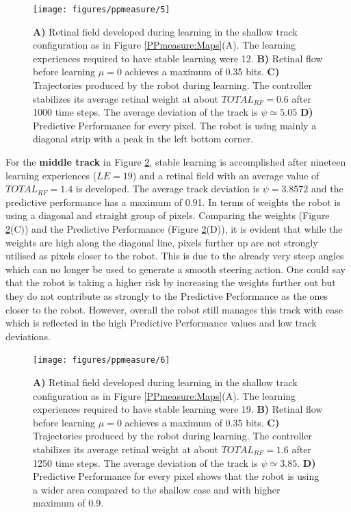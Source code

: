\begin{figure}[!hbt]
	\begin{center}
	\texttt{[image: figures/ppmeasure/5]}
	\end{center}
	\caption[Performance for the shallow track]{
	{\bf A)} Retinal field developed during learning in the shallow track configuration as in Figure \ref{PPmeasure:Maps}(A).
		      The learning experiences required to have stable learning were 12.
	{\bf B)} Retinal flow before learning $\mu=0$ achieves a maximum of 0.35 bits. 
	{\bf C)} Trajectories produced by the robot during learning. The controller stabilizes its average retinal weight at about $TOTAL_{RF}=0.6$ after 1000 time steps. The average deviation of the track is $\psi \simeq 5.05$  
	{\bf D)} Predictive Performance for every pixel. The robot is using mainly a diagonal strip with a peak in the left bottom corner. \label{PPmeasure:shallow}}
\end{figure}

For the \textbf{middle track} in Figure \ref{PPmeasure:middle}, stable learning is accomplished
after nineteen learning experiences ($LE=19$) and a retinal field
with an average value of $TOTAL_{RF}=1.4$ is developed.
The average track deviation is $\psi=3.8572$ and the predictive performance has a
maximum of 0.91.
In terms of weights the robot is using a diagonal and straight group of pixels.
Comparing the weights (Figure \ref{PPmeasure:middle}(C)) and the
Predictive Performance (Figure \ref{PPmeasure:middle}(D)),
it is evident that while the weights are high along the diagonal line, pixels further up
are not strongly utilised as pixels closer to the robot.
This is due to the already very steep angles which can no
longer be used to generate a smooth steering action. One could say that the
robot is taking a higher risk by increasing the weights further out but they do
not contribute as strongly to the Predictive Performance as the ones closer to
the robot. However, overall the robot still manages this track with ease which is
reﬂected in the high Predictive Performance values and low track deviations.

\begin{figure}[!hbt]
	\begin{center}
		\texttt{[image: figures/ppmeasure/6]}
	\end{center}
	\caption[Performance for the intermediate track]{
	{\bf A)} Retinal field developed during learning in the shallow track configuration as in Figure \ref{PPmeasure:Maps}(A).
		      The learning experiences required to have stable learning were 19.
	{\bf B)} Retinal flow before learning $\mu=0$ achieves a maximum of 0.35 bits. 
	{\bf C)} Trajectories produced by the robot during learning. The controller stabilizes its average retinal weight at about $TOTAL_{RF}=1.6$ after 1250 time steps. The average deviation of the track is $\psi \simeq 3.85$.  
	{\bf D)} Predictive Performance for every pixel shows that the robot is using a wider area compared to the shallow case and with higher maximum of 0.9. \label{PPmeasure:middle}}
\end{figure}

